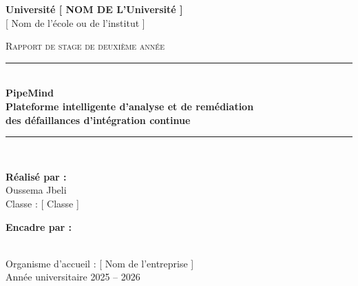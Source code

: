 \documentclass[12pt,a4paper,oneside]{report}
\begin{document}
\begin{titlepage}
\centering
\vspace*{0.5cm}

{\Large\bfseries Université [ NOM DE L'Université ]}\\[0.3cm]
{\large [ Nom de l'école ou de l'institut ]}\\[1.2cm]


\vspace{1.4cm}

{\large\scshape Rapport de stage de deuxième année}\\[1.4cm]

\rule{0.8\textwidth}{1pt}\\[0.7cm]
{\Huge\bfseries\color{pmgreen} PipeMind}\\[0.5cm]
{\large\bfseries Plateforme intelligente d'analyse et de remédiation\\[0.2cm]
des défaillances d'intégration continue}\\[0.6cm]
\rule{0.8\textwidth}{1pt}\\[1.6cm]

\begin{minipage}{0.45\textwidth}
\begin{flushleft}
\textbf{Réalisé par :}\\
Oussema Jbeli\\
Classe : [ Classe ]
\end{flushleft}
\end{minipage}
\hfill
\begin{minipage}{0.45\textwidth}
\begin{flushright}
\textbf{Encadre par :}\\
[ Encadrant académique ]\\
[ Encadrant professionnel ]
\end{flushright}
\end{minipage}

\vfill

{\large Organisme d'accueil : [ Nom de l'entreprise ]}\\[0.4cm]
{\large Année universitaire 2025 -- 2026}

\end{titlepage}
\end{document}

